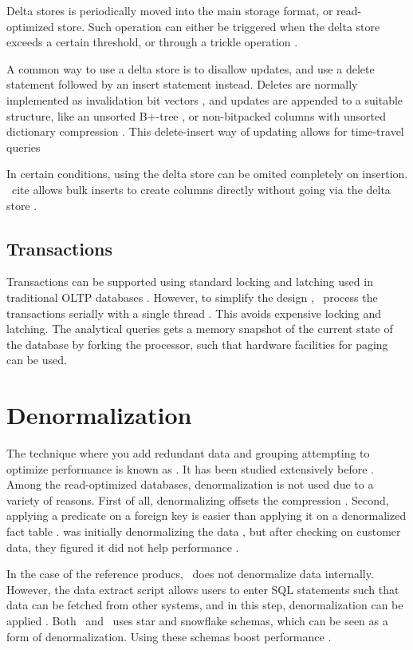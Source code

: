 Delta stores is periodically moved into the main storage format, or read-optimized store. Such operation can either be triggered when the delta store exceeds a certain threshold, or through a trickle operation \cite{Lahiri2015-mz, Farber2012-vh}.

A common way to use a delta store is to disallow updates, and use a delete statement followed by an insert statement instead. Deletes are normally implemented as invalidation bit vectors \cite{Raman2013-em, Lamb2012-kg}, and updates are appended to a suitable structure, like an unsorted B+-tree \cite{Psaroudakis2014-ma}, or non-bitpacked columns with unsorted dictionary compression \cite{Farber2012-vh}. This delete-insert way of updating allows for time-travel queries \cite{Scwalb2014-hn, Plattner2014-fr}

In certain conditions, using the delta store can be omited completely on insertion. \mssql~cite allows bulk inserts to create columns directly without going via the delta store \cite{Larson2013-mc}.

\subsection{Transactions}
\label{sub:Transactions}
Transactions can be supported using standard locking and latching used in traditional OLTP databases \cite{Lamb2012-kg}. However, to simplify the design , \hyper~process the transactions serially with a single thread \cite{Psaroudakis2014-ma}. This avoids expensive locking and latching. The analytical queries gets a memory snapshot of the current state of the database by forking the processor, such that hardware facilities for paging can be used.

\section{Denormalization}
\label{sec:Denormalization}
The technique where you add redundant data and grouping attempting to optimize performance is known as  \cite{Wikipedia_contributors2015-az}. It has been studied extensively before \cite{Raman2008-gi}. Among the read-optimized databases, denormalization is not used due to a variety of reasons. First of all, denormalizing offsets the compression \cite{Barber2012-xt}. Second, applying a predicate on a foreign key is easier than applying it on a denormalized fact table \cite{Abadi2008-dd}. \blink was initially denormalizing the data \cite{Johnson2008-cp}, but after checking on customer data, they figured it did not help performance \cite{Barber2012-xt}.

In the case of the reference producs, \qlikview~does not denormalize data internally. However, the data extract script allows users to enter SQL statements such that data can be fetched from other systems, and in this step, denormalization can be applied \cite{Qlik2011-yc}. Both \qlikview~and \tableau~uses star and snowflake schemas, which can be seen as a form of denormalization. Using these schemas boost performance \cite{Kamkolkar2015-iq}.



